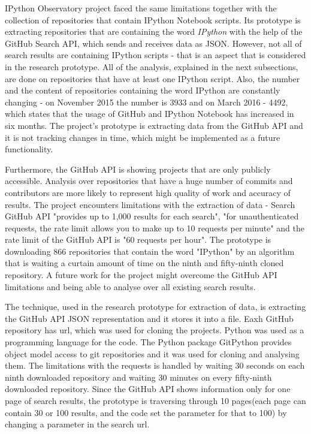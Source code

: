 IPython Observatory project faced the same limitations together with the collection of repositories that contain IPython Notebook scripts. Its prototype is extracting repositories that are containing the word \textit{IPython} with the help of the GitHub Search API\cite{GitAPISearch}, which sends and receives data as JSON\cite{json}. However, not all of search results are containing IPython scripts - that is an aspect that is considered in the research prototype. All of the analysis, explained in the next subsections, are done on repositories that have at least one IPython script. Also, the number and the content of repositories containing the word IPython are constantly changing - on November 2015 the number is 3933 and on March 2016 - 4492, which states that the usage of GitHub and IPython Notebook has increased in six months. The project's prototype is extracting data from the GitHub API and it is not tracking changes in time, which might be implemented as a future functionality.

Furthermore, the GitHub API is showing projects that are only publicly accessible. Analysis over repositories that have a huge number of commits and contributors are more likely to represent high quality of work and accuracy of results. The project encounters limitations with the extraction of data - Search GitHub API "provides up to 1,000 results for each search"\cite{GitAPISearch}, "for unauthenticated requests, the rate limit allows you to make up to 10 requests per minute"\cite{GitAPISearch} and the rate limit of the GitHub API is "60 requests per hour"\cite{GitAPI}. The prototype is downloading 866 repositories that contain the word "IPython" by an algorithm that is waiting a curtain amount of time on the ninth and fifty-ninth cloned repository. A future work for the project might overcome the GitHub API limitations and being able to analyse over all existing search results. 

The technique, used in the research prototype for extraction of data, is extracting the GitHub API JSON representation and it stores it into a file. Eaxh GitHub repository has url, which was used for cloning the projects. Python was used as a programming language for the code. The Python package GitPython\cite{GitPython} provides object model access to git repositories and it was used for cloning and analysing them. The limitations with the requests is handled by waiting 30 seconds on each ninth downloaded repository and waiting 30 minutes on every fifty-ninth downloaded repository. Since the GitHub API shows information only for one page of search results, the prototype is traversing through 10 pages(each page can contain 30 or 100 results, and the code set the parameter for that to 100) by changing a parameter in the search url. 

